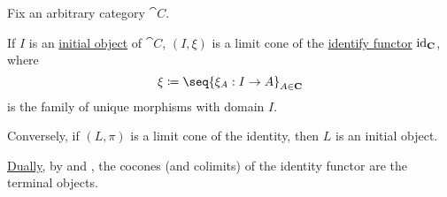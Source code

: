 \begin{proposition}\label{thm:limits_of_identity_functor}
  Fix an arbitrary category \( \cat{C} \).

  \begin{thmenum}
     If \( I \) is an \hyperref[def:universal_object/initial]{initial object} of \( \cat{C} \), \( (I, \xi) \) is a limit cone of the \hyperref[eq:def:category_of_small_categories/identity]{identify functor} \( \operatorname{id}_{\operatorname{\mathbf{C}}} \), where
    \begin{equation*}
      \xi \coloneqq \seq{ \xi_A: I \to A }_{A \in \cat{C}}
    \end{equation*}
    is the family of unique morphisms with domain \( I \).

     Conversely, if \( (L, \pi) \) is a limit cone of the identity, then \( L \) is an initial object.
  \end{thmenum}

  \hyperref[thm:categorical_principle_of_duality]{Dually}, by  and , the cocones (and colimits) of the identity functor are the terminal objects.
\end{proposition}
